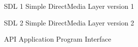 \begin{siglas}
  \item[SDL 1] Simple DirectMedia Layer version 1
  \item[SDL 2] Simple DirectMedia Layer version 2
  \item[API] Application Program Interface
\end{siglas}
%